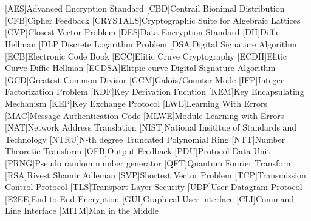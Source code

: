 \cleardoublepage
\chapter*{\listofabbrevname}
{}

\begin{acronym}[mmmmmmm]
	[AES]{Advanced Encryption Standard}
	[CBD]{Centrail Bionimal Distribution}
	[CFB]{Cipher Feedback}
	[CRYSTALS]{Cryptographic Suite for Algebraic Lattices}
	[CVP]{Closest Vector Problem}
	[DES]{Data Encryption Standard}
	[DH]{Diffie-Hellman}
	[DLP]{Discrete Logarithm Problem}
	[DSA]{Digital Signature Algorithm}
	[ECB]{Electronic Code Book}
	[ECC]{Elitic Cruve Cryptography}
	[ECDH]{Elitic Curve Diffie-Hellman}
	[ECDSA]{Elitpic curve Digital Signature Algorithm}
	[GCD]{Greatest Common Divisor}
	[GCM]{Galois/Counter Mode}
	[IFP]{Integer Factorization Problem}
	[KDF]{Key Derivation Fucntion}
	[KEM]{Key Encapsulating Mechanism}
	[KEP]{Key Exchange Protocol}
	[LWE]{Learning With Errors}
	[MAC]{Message Authentication Code}
	[MLWE]{Module Learning with Errors}
	[NAT]{Network Address Translation}
	[NIST]{National Insititue of Standards and Technology}
	[NTRU]{N-th degree Truncated Polynomial Ring}
	[NTT]{Number Theoretic Transform}
	[OFB]{Output Feedback}
	[PDU]{Protocol Data Unit}
	[PRNG]{Pseudo random number generator}
	[QFT]{Quantum Fourier Transform}
	[RSA]{Rivest Shamir Adleman}
	[SVP]{Shortest Vector Problem}
	[TCP]{Transmission Control Protocol}
	[TLS]{Transport Layer Security}
	[UDP]{User Datagram Protocol}
	[E2EE]{End-to-End Encryption}
	[GUI]{Graphical User interface}
	[CLI]{Command Line Interface}
	[MITM]{Man in the Middle}
\end{acronym}
